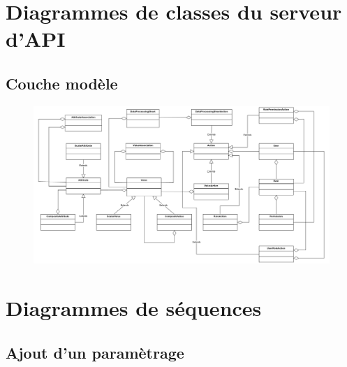 \clearpage
\section{Diagrammes de classes du serveur d'API}


\subsection{Couche modèle}
\begin{figure}[H]
    \centering
    \includegraphics[height=.75\textwidth, angle=90]{images/class-diagram.png}    
\end{figure}


\section{Diagrammes de séquences}

\subsection{Ajout d'un paramètrage}

\vspace{.2cm}

